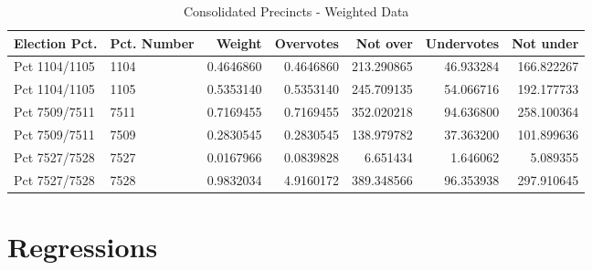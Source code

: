 \documentclass[12pt,twoside]{reedthesis}
\newenvironment{Shaded}{\begin{snugshade}}{\end{snugshade}}
\newcommand{\ControlFlowTok}[1]{\textcolor[rgb]{0.13,0.29,0.53}{\textbf{#1}}}
\newcommand{\DataTypeTok}[1]{\textcolor[rgb]{0.13,0.29,0.53}{#1}}
\newcommand{\DecValTok}[1]{\textcolor[rgb]{0.00,0.00,0.81}{#1}}
\newcommand{\KeywordTok}[1]{\textcolor[rgb]{0.13,0.29,0.53}{\textbf{#1}}}
\newcommand{\NormalTok}[1]{#1}
\newcommand{\OperatorTok}[1]{\textcolor[rgb]{0.81,0.36,0.00}{\textbf{#1}}}
\newcommand{\OtherTok}[1]{\textcolor[rgb]{0.56,0.35,0.01}{#1}}
\newcommand{\StringTok}[1]{\textcolor[rgb]{0.31,0.60,0.02}{#1}}
\theoremstyle{definition}
\theoremstyle{definition}
\theoremstyle{definition}
\theoremstyle{remark}
\begin{document}
\begin{Shaded}
\end{Shaded}
\begin{longtable}[t]{llrrrrr}
\caption[Combined Precincts - Weighted]{\label{tab:unnamed-chunk-4}Consolidated Precincts - Weighted Data}\\
\toprule
Election Pct. & Pct. Number & Weight & Overvotes & Not over & Undervotes & Not under\\
\midrule
Pct 1104/1105 & 1104 & 0.4646860 & 0.4646860 & 213.290865 & 46.933284 & 166.822267\\
Pct 1104/1105 & 1105 & 0.5353140 & 0.5353140 & 245.709135 & 54.066716 & 192.177733\\
Pct 7509/7511 & 7511 & 0.7169455 & 0.7169455 & 352.020218 & 94.636800 & 258.100364\\
Pct 7509/7511 & 7509 & 0.2830545 & 0.2830545 & 138.979782 & 37.363200 & 101.899636\\
Pct 7527/7528 & 7527 & 0.0167966 & 0.0839828 & 6.651434 & 1.646062 & 5.089355\\
Pct 7527/7528 & 7528 & 0.9832034 & 4.9160172 & 389.348566 & 96.353938 & 297.910645\\
\bottomrule
\end{longtable}
\hypertarget{regressions}{%
\section{Regressions}\label{regressions}}
\end{document}
